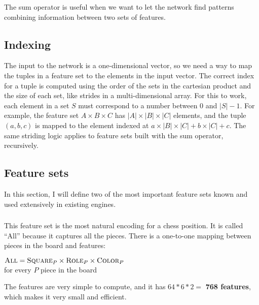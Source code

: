 The sum operator is useful when we want to let the network find patterns combining information between two sets of features.

\subsection{Indexing}

The input to the network is a one-dimensional vector, so we need a way to map the tuples in a feature set to the elements in the input vector. The correct index for a tuple is computed using the order of the sets in the cartesian product and the size of each set, like strides in a multi-dimensional array. For this to work, each element in a set $S$ must correspond to a number between $0$ and $|S| - 1$. For example, the feature set $A \times B \times C$ has $|A| \times |B| \times |C|$ elements, and the tuple $(a, b, c)$ is mapped to the element indexed at $a \times |B| \times |C| + b \times |C| + c$. The same striding logic applies to feature sets built with the sum operator, recursively.

\subsection{Feature sets}

In this section, I will define two of the most important feature sets known and used extensively in existing engines.

\subsubsection{\mdseries{}}

This feature set is the most natural encoding for a chess position. It is called \enquote{All} because it captures all the pieces. There is a one-to-one mapping between pieces in the board and features:

\begin{center}
    $\textsc{All} = \textsc{Square}_{P} \times \textsc{Role}_{P} \times \textsc{Color}_{P}$ \\
    for every $P$ piece in the board \\
\end{center}

The features are very simple to compute, and it has $64*6*2=$\textbf{ 768 features}, which makes it very small and efficient.

\subsubsection{\mdseries{}}

